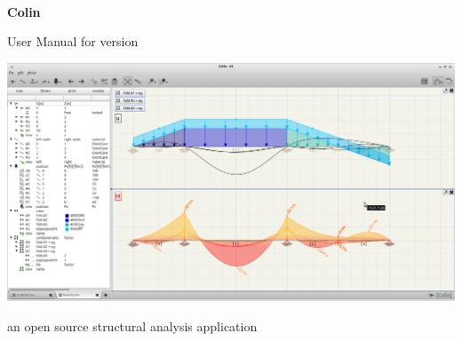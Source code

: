 \begin{titlepage}

\begin{center}
\ \\
\vspace{100pt}
\Huge{\textbf{Colin}}

\Large{User Manual for version }

\vspace{100pt}
\includegraphics[width=\textwidth]{./pictures/title.png}
\end{center}
\vspace{40pt}
\begin{center}
\large{an open source structural analysis application}
\end{center}

\end{titlepage}
\clearpage
